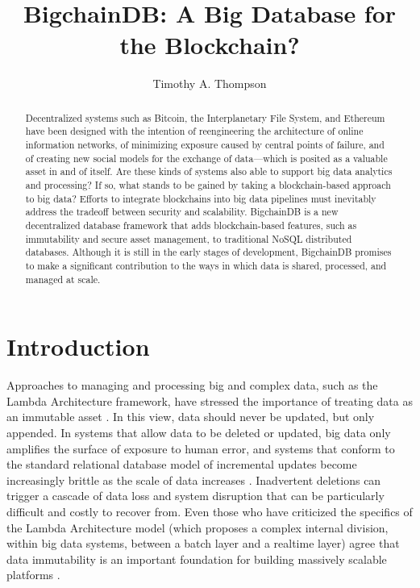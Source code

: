 \documentclass[sigconf]{acmart}
\begin{document}
\title{BigchainDB: A Big Database for the Blockchain?}
\author{Timothy A. Thompson}

\begin{abstract} 
Decentralized systems such as Bitcoin, the Interplanetary File System, and Ethereum have been designed with the intention of reengineering the architecture of online information networks, of minimizing exposure caused by central points of failure, and of creating new social models for the exchange of data---which is posited as a valuable asset in and of itself. Are these kinds of systems also able to support big data analytics and processing? If so, what stands to be gained by taking a blockchain-based approach to big data? Efforts to integrate blockchains into big data pipelines must inevitably address the tradeoff between security and scalability. BigchainDB is a new decentralized database framework that adds blockchain-based features, such as immutability and secure asset management, to traditional NoSQL distributed databases. Although it is still in the early stages of development, BigchainDB promises to make a significant contribution to the ways in which data is shared, processed, and managed at scale.
\end{abstract}


\maketitle

\section{Introduction}
Approaches to managing and processing big and complex data, such as the Lambda Architecture framework, have stressed the importance of treating data as an immutable asset \cite{nM15}. In this view, data should never be updated, but only appended. In systems that allow data to be deleted or updated, big data only amplifies the surface of exposure to human error, and systems that conform to the standard relational database model of incremental updates become increasingly brittle as the scale of data increases \cite{nM15}. Inadvertent deletions can trigger a cascade of data loss and system disruption that can be particularly difficult and costly to recover from. Even those who have criticized the specifics of the Lambda Architecture model (which proposes a complex internal division, within big data systems, between a batch layer and a realtime layer) agree that data immutability is an important foundation for building massively scalable platforms \cite{jK14}.
\end{document}
